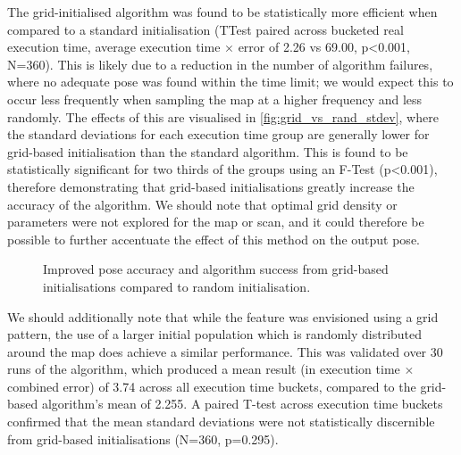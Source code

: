 \documentclass[authoryearcitations]{UoYCSproject}
\begin{document}
The grid-initialised algorithm was found to be statistically more efficient when compared to a standard initialisation (TTest paired across bucketed real execution time, average execution time $\times$ error of 2.26 vs 69.00, p<0.001, N=360). This is likely due to a reduction in the number of algorithm failures, where no adequate pose was found within the time limit; we would expect this to occur less frequently when sampling the map at a higher frequency and less randomly. The effects of this are visualised in \autoref{fig:grid_vs_rand_stdev}, where the standard deviations for each execution time group are generally lower for grid-based initialisation than the standard algorithm. This is found to be statistically significant for two thirds of the groups using an F-Test (p<0.001), therefore demonstrating that grid-based initialisations greatly increase the accuracy of the algorithm. We should note that optimal grid density or parameters were not explored for the map or scan, and it could therefore be possible to further accentuate the effect of this method on the output pose.\newline

\datatablegridstdev

\begin{figure}
	\centering
	\caption[Grid vs. random population layout]{Improved pose accuracy and algorithm success from grid-based initialisations compared to random initialisation.}
	\label{fig:grid_vs_rand_stdev}
\end{figure}
We should additionally note that while the feature was envisioned using a grid pattern, the use of a larger initial population which is randomly distributed around the map does achieve a similar performance. This was validated over 30 runs of the algorithm, which produced a mean result (in execution time $\times$ combined error) of 3.74 across all execution time buckets, compared to the grid-based algorithm's mean of 2.255. A paired T-test across execution time buckets confirmed that the mean standard deviations were not statistically discernible from grid-based initialisations (N=360, p=0.295). \newline
\end{document}
